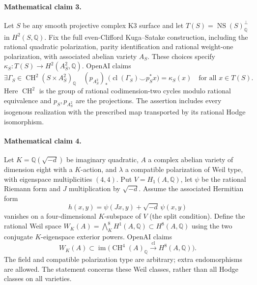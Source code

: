 \documentclass[11pt]{article}
\begin{document}
\paragraph{Mathematical claim 3.} Let $S$ be any smooth projective complex K3 surface and let $T(S)=\operatorname{NS}(S)_{\mathbb Q}^{\perp}$ in $H^2(S,\mathbb Q)$. Fix the full even-Clifford Kuga--Satake construction, including the rational quadratic polarization, parity identification and rational weight-one polarization, with associated abelian variety $A_S$. These choices specify $\kappa_S:T(S)\to H^2(A_S^2,\mathbb Q)$. OpenAI claims
\[
\exists\Gamma_S\in\operatorname{CH}^2(S\times A_S^2)_{\mathbb Q}\quad
(p_{A_S^2})_*\bigl(\operatorname{cl}(\Gamma_S)\smile p_S^*x\bigr)=\kappa_S(x)
\quad\text{for all }x\in T(S).
\]
Here $\operatorname{CH}^2$ is the group of rational codimension-two cycles modulo rational equivalence and $p_S,p_{A_S^2}$ are the projections. The assertion includes every isogenous realization with the prescribed map transported by its rational Hodge isomorphism.

\paragraph{Mathematical claim 4.} Let $K=\mathbb Q(\sqrt{-d})$ be imaginary quadratic, $A$ a complex abelian variety of dimension eight with a $K$-action, and $\lambda$ a compatible polarization of Weil type, with eigenspace multiplicities $(4,4)$. Put $V=H_1(A,\mathbb Q)$, let $\psi$ be the rational Riemann form and $J$ multiplication by $\sqrt{-d}$. Assume the associated Hermitian form
\[
h(x,y)=\psi(Jx,y)+\sqrt{-d}\,\psi(x,y)
\]
vanishes on a four-dimensional $K$-subspace of $V$ (the split condition). Define the rational Weil space $W_K(A)=\bigwedge_K^8H^1(A,\mathbb Q)\subset H^8(A,\mathbb Q)$ using the two conjugate $K$-eigenspace exterior powers. OpenAI claims
\[
W_K(A)\subset\operatorname{im}\bigl(\operatorname{CH}^4(A)_{\mathbb Q}\xrightarrow{\operatorname{cl}}H^8(A,\mathbb Q)\bigr).
\]
The field and compatible polarization type are arbitrary; extra endomorphisms are allowed. The statement concerns these Weil classes, rather than all Hodge classes on all varieties.
\end{document}
